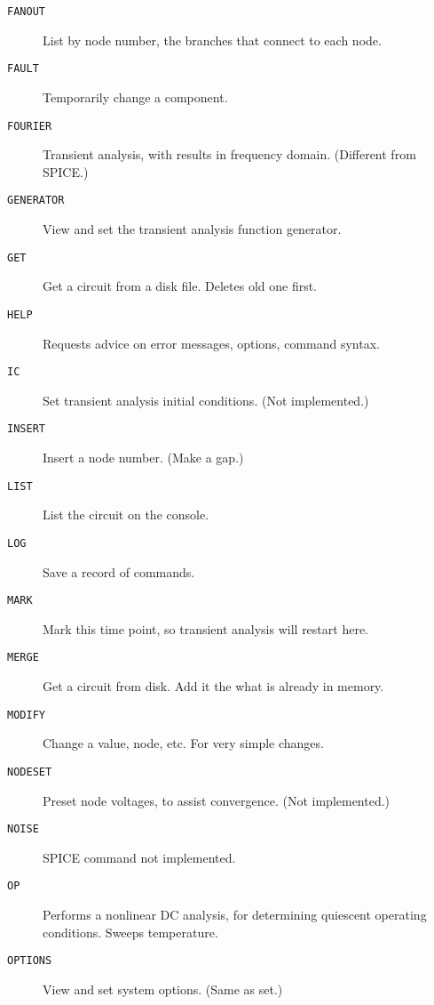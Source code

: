 \begin{description}
\item[{\tt FANOUT}] List by node number, the branches that connect to each
node.

\item[{\tt FAULT}] Temporarily change a component.

\item[{\tt FOURIER}] Transient analysis, with results in
frequency domain.  (Different from SPICE.)

\item[{\tt GENERATOR}] View and set the transient analysis function
generator.

\item[{\tt GET}] Get a circuit from a disk file.  Deletes old one first.

\item[{\tt HELP}] Requests advice on error messages, options, command
syntax.

\item[{\tt IC}] Set transient analysis initial conditions.
(Not implemented.)

\item[{\tt INSERT}] Insert a node number.  (Make a gap.)

\item[{\tt LIST}] List the circuit on the console.

\item[{\tt LOG}] Save a record of commands.

\item[{\tt MARK}] Mark this time point, so transient analysis will restart
here.

\item[{\tt MERGE}] Get a circuit from disk.  Add it the what is already in
memory.

\item[{\tt MODIFY}] Change a value, node, etc.  For very simple changes.

\item[{\tt NODESET}] Preset node voltages, to assist convergence.  (Not
implemented.)

\item[{\tt NOISE}] SPICE command not implemented.

\item[{\tt OP}] Performs a nonlinear DC analysis, for determining quiescent
operating conditions.  Sweeps temperature.

\item[{\tt OPTIONS}] View and set system options.  (Same as set.)


\end{description}
